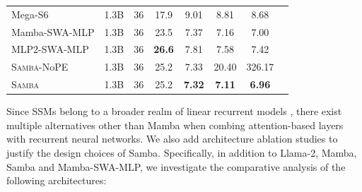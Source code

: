 \documentclass{article}
\begin{document}
\begin{table}[!htbp]
\begin{tabular}{lccccccc}
Mega-S6 & 1.3B & 36 & 17.9 & 9.01 & 8.81 & 8.68 \\
Mamba-SWA-MLP & 1.3B & 36 & 23.5 & 7.37 & 7.16 & 7.00 \\
MLP2-SWA-MLP & 1.3B & 36 & \bf 26.6 & 7.81 & 7.58 & 7.42 \\
\textsc{Samba}-NoPE & 1.3B  & 36   &  25.2 &   7.33  & 20.40  & 326.17 \\
\textsc{Samba} & 1.3B  & 36   &  25.2 & \bf  7.32  & \bf 7.11  & \bf 6.96 \\
\bottomrule
\end{tabular}
\label{tab:SCs}
\vspace{-0.4cm}
\end{table}


Since SSMs belong to a broader realm of linear recurrent models \citep{lru, hgrn, yang2023gated, katsch2023gateloop, qin2024hgrn2}, there exist multiple alternatives other than Mamba when combing attention-based layers with recurrent neural networks. We also add architecture ablation studies to justify the design choices of Samba. Specifically, in addition to Llama-2, Mamba, Samba and Mamba-SWA-MLP, we investigate the comparative analysis of the following architectures:

\end{document}
